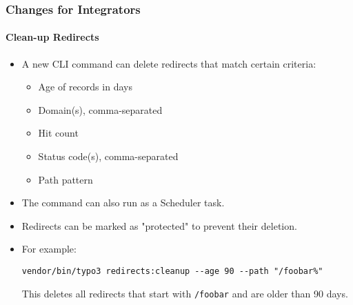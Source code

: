 %

\begin{frame}[fragile]
	\frametitle{Changes for Integrators}
	\framesubtitle{Clean-up Redirects}


	\begin{itemize}
		\item A new CLI command can delete redirects that match certain criteria:
			\begin{itemize}
				\item Age of records in days
				\item Domain(s), comma-separated
				\item Hit count
				\item Status code(s), comma-separated
				\item Path pattern
			\end{itemize}
		\item The command can also run as a Scheduler task.
		\item Redirects can be marked as "protected" to prevent their deletion.
		\item For example:\newline
\begin{lstlisting}
vendor/bin/typo3 redirects:cleanup --age 90 --path "/foobar%"
\end{lstlisting}

			\smaller
				This deletes all redirects that start with \texttt{/foobar} and are older than 90 days.
			\normalsize

	\end{itemize}
\end{frame}

